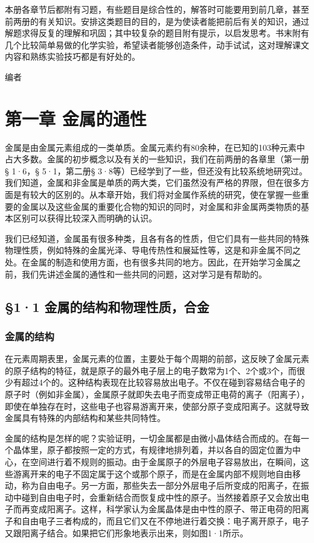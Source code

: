 本册各章节后都附有习题，有些题目是综合性的，解答时可能要用到前几章，甚至前两册的有关知识。安排这类题目的目的，是为使读者能把前后有关的知识，通过解题求得反复的理解和巩固；其中较复杂的题目附有提示，以启发思考。书末附有几个比较简单易做的化学实验，希望读者能够创造条件，动手试试，这对理解课文内容和熟练实验技巧都是有好处的。

编者

\chapter{第一章 金属的通性}

金属是由金属元素组成的一类单质。金属元素约有80余种，在已知的103种元素中占大多数。金属的初步概念以及有关的一些知识，我们在前两册的各章里（第一册§
1·6，§ 5·1，第二册§
3·8等）已经学到了一些，但还没有比较系统地研究过。我们知道，金属和非金属是单质的两大类，它们虽然没有严格的界限，但在很多方面是有较大的区别的。从本章开始，我们将对金属作系统的研究，使在掌握一些重要的金属以及这些金属的重要化合物的知识的同时，对金属和非金属两类物质的基本区别可以获得比较深入而明确的认识。

我们已经知道，金属虽有很多种类，且各有各的性质，但它们具有一些共同的特殊物理性质，例如特殊的金属光泽、导电传热性和展延性等，这是和非金属不同之处。在金属的制造和使用方面，也有很多共同的地方。因此，在开始学习金属之前，我们先讲述金属的通性和一些共同的问题，这对学习是有帮助的。

\section{§1·1 金属的结构和物理性质，合金}

\subsection{金属的结构}

在元素周期表里，金属元素的位置，主要处于每个周期的前部，这反映了金属元素的原子结构的特征，就是原子的最外电子层上的电子数常为1个、2个或3个，而很少有超过4个的。这种结构表现在比较容易放出电子。不仅在碰到容易结合电子的原子时（例如非金属），金属原子就即失去电子而变成带正电荷的离子（阳离子），即使在单独存在时，这些电子也容易游离开来，使部分原子变成阳离子。这就导致金属具有特殊的内部结构和某些共同特性。

金属的结构是怎样的呢？实验证明，一切金属都是由微小晶体结合而成的。在每一个晶体里，原子都按照一定的方式，有规律地排列着，并以各自的固定位置为中心，在空间进行着不规则的振动。由于金属原子的外层电子容易放出，在瞬间，这些游离开来的电子不固定属于这个或那个原子，而是在金属内部不规则地自由移动，称为自由电子。另一方面，那些失去一部分外层电子后所变成的阳离子，在振动中碰到自由电子时，会重新结合而恢复成中性的原子。当然接着原子又会放出电子而再变成阳离子。这样，科学家认为金属晶体是由中性的原子、带正电荷的阳离子和自由电子三者构成的，而且它们又在不停地进行着交换：电子离开原子，电子又跟阳离子结合。如果把它们形象地表示出来，则如图1·1所示。

